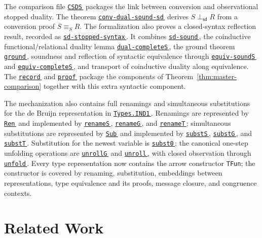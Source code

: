 \documentclass[submission,copyright,creativecommons]{eptcs}
\newcommand{\AgdaHen}{}
\newcommand{\AgdaLink}[2]{\href{src/#1}{\mbox{\texttt{#2}\,\AgdaHen}}}
\newcommand{\AgdaFile}[2]{\AgdaLink{#1.html}{#2}}
\newcommand{\AgdaName}[3]{\AgdaLink{#1.html\##2}{#3}}
\newcommand{\SuspDual}[1]{\overline{#1}}
\newcommand{\ConvS}{\mathrel{\equiv_S}}
\newcommand{\StopDual}{\mathrel{\perp_{\mathsf{sd}}}}
\begin{document}
The comparison file \AgdaFile{ConversionStopDualSoundness}{CSDS} packages the
link between conversion and observational stopped duality.  The theorem
\AgdaName{ConversionStopDualSoundness}{conv-dual-sound-sd}{conv-dual-sound-sd}
derives $S \StopDual R$ from a conversion proof
$\SuspDual{S} \ConvS R$.  The formalization also proves a closed-syntax
reflection result, recorded as
\AgdaName{ConversionStopDualSoundness}{MasterComparison.sd-stopped-syntax}{sd-stopped-syntax}.
It combines
\AgdaName{StopDualSoundness}{sd-sound}{sd-sound}, the coinductive
functional/relational duality lemma
\AgdaName{Types.COI}{dual-completeS}{dual-completeS}, the ground theorem
\AgdaName{DualStopAtMu}{ground}{ground}, soundness and reflection of
syntactic equivalence through
\AgdaName{StopDualSoundness}{equiv-soundS}{equiv-soundS} and
\AgdaName{StopDualSoundness}{equiv-completeS}{equiv-completeS}, and transport
of coinductive duality along equivalence.  The
\AgdaName{ConversionStopDualSoundness}{MasterComparison}{record} and
\AgdaName{ConversionStopDualSoundness}{master-comparison}{proof}
package the components of Theorem~\ref{thm:master-comparison} together with
this extra syntactic component.

The mechanization also contains full renamings and simultaneous substitutions
for the de Bruijn representation in \AgdaFile{Types.IND1}{Types.IND1}.
Renamings are represented by \AgdaName{Types.IND1}{Ren}{Ren} and implemented
by \AgdaName{Types.IND1}{renameS}{renameS},
\AgdaName{Types.IND1}{renameG}{renameG}, and
\AgdaName{Types.IND1}{renameT}{renameT}; simultaneous substitutions are
represented by \AgdaName{Types.IND1}{Sub}{Sub} and implemented by
\AgdaName{Types.IND1}{substS}{substS},
\AgdaName{Types.IND1}{substG}{substG}, and
\AgdaName{Types.IND1}{substT}{substT}.  Substitution for the newest variable
is \AgdaName{Types.IND1}{subst0}{subst0}; the canonical one-step unfolding
operations are \AgdaName{Types.IND1}{unrollG}{unrollG} and
\AgdaName{Types.IND1}{unroll}{unroll}, with closed observation through
\AgdaName{Types.IND1}{unfold}{unfold}.  Every type representation now
contains the arrow constructor \texttt{TFun}; the constructor is covered by
renaming, substitution, embeddings between representations, type equivalence
and its proofs, message closure, and congruence contexts.


\section{Related Work}
\label{sec:related-work}
\end{document}
